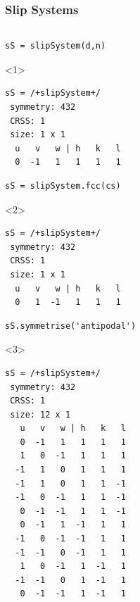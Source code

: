 \documentclass[compress]{beamer}
\begin{document}
\begin{frame}[fragile]
  \frametitle{Slip Systems}

  \begin{columns}
    \begin{column}{8cm}
      \vspace{-0.6cm}
      \begin{overlayarea}{\textwidth}{8cm}
  \begin{lstlisting}[style=input]
sS = slipSystem(d,n)
\end{lstlisting}
\begin{onlyenv}<1>
  \vspace{-0.3cm}
  \begin{lstlisting}[style=output]
sS = /+slipSystem+/
 symmetry: 432
 CRSS: 1
 size: 1 x 1
  u   v   w | h   k   l
  0  -1   1   1   1   1
  \end{lstlisting}
\end{onlyenv}

\pause

      \vspace{-0.1cm}
  \begin{lstlisting}[style=input]
sS = slipSystem.fcc(cs)
\end{lstlisting}
\begin{onlyenv}<2>
  \vspace{-0.3cm}
  \begin{lstlisting}[style=output]
sS = /+slipSystem+/
 symmetry: 432
 CRSS: 1
 size: 1 x 1
  u   v   w | h   k   l
  0   1  -1   1   1   1
  \end{lstlisting}
\end{onlyenv}

\pause
      \vspace{-0.1cm}
        \begin{lstlisting}[style=input]
sS.symmetrise('antipodal')
        \end{lstlisting}
        \begin{onlyenv}<3>
          \vspace{-0.3cm}
          \begin{lstlisting}[style=output]
sS = /+slipSystem+/
 symmetry: 432
 CRSS: 1
 size: 12 x 1
   u   v   w | h   k   l
   0  -1   1   1   1   1
   1   0  -1   1   1   1
  -1   1   0   1   1   1
  -1   1   0   1   1  -1
  -1   0  -1   1   1  -1
   0  -1  -1   1   1  -1
   0  -1   1  -1   1   1
  -1   0  -1  -1   1   1
  -1  -1   0  -1   1   1
   1   0  -1   1  -1   1
  -1  -1   0   1  -1   1
   0  -1  -1   1  -1   1
          \end{lstlisting}
        \end{onlyenv}


\end{overlayarea}
\end{column}
\end{columns}
\end{frame}
\end{document}
